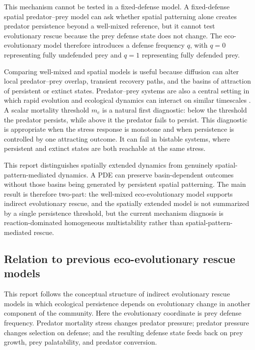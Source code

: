 \documentclass[11pt]{article}
\begin{document}
This mechanism cannot be tested in a fixed-defense model. A fixed-defense spatial predator--prey model can ask whether spatial patterning alone creates predator persistence beyond a well-mixed reference, but it cannot test evolutionary rescue because the prey defense state does not change. The eco-evolutionary model therefore introduces a defense frequency \(q\), with \(q=0\) representing fully undefended prey and \(q=1\) representing fully defended prey.

Comparing well-mixed and spatial models is useful because diffusion can alter local predator--prey overlap, transient recovery paths, and the basins of attraction of persistent or extinct states. Predator--prey systems are also a central setting in which rapid evolution and ecological dynamics can interact on similar timescales \citep{YoshidaEtAl2003,KasadaYamamichiYoshida2014}. A scalar mortality threshold \(m_c\) is a natural first diagnostic: below the threshold the predator persists, while above it the predator fails to persist. This diagnostic is appropriate when the stress response is monotone and when persistence is controlled by one attracting outcome. It can fail in bistable systems, where persistent and extinct states are both reachable at the same stress.

This report distinguishes spatially extended dynamics from genuinely spatial-pattern-mediated dynamics. A PDE can preserve basin-dependent outcomes without those basins being generated by persistent spatial patterning. The main result is therefore two-part: the well-mixed eco-evolutionary model supports indirect evolutionary rescue, and the spatially extended model is not summarized by a single persistence threshold, but the current mechanism diagnosis is reaction-dominated homogeneous multistability rather than spatial-pattern-mediated rescue.

\subsection{Relation to previous eco-evolutionary rescue models}

This report follows the conceptual structure of indirect evolutionary rescue models in which ecological persistence depends on evolutionary change in another component of the community. Here the evolutionary coordinate is prey defense frequency. Predator mortality stress changes predator pressure; predator pressure changes selection on defense; and the resulting defense state feeds back on prey growth, prey palatability, and predator conversion.
\end{document}

